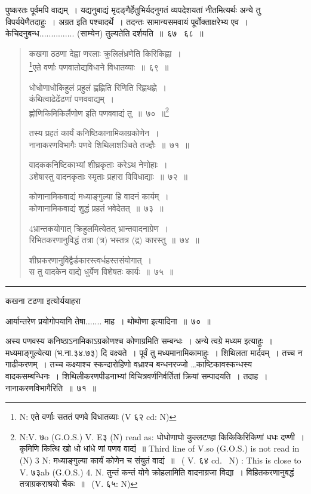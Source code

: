 \documentclass[11pt, openany]{book}
\begin{document}
पुष्करतः पूर्वमपि वाद्यम्~। यद्यनुबाद्यं मृदङ्गैर्हेतुभिर्यदनुगतं व्यपदेशयतां नीतमित्यर्थः अन्ये तु विपर्ययेणैतदाहुः~। अग्रत इति पश्चादर्थे~। तदन्तः सामान्यसमवायं पूर्वोक्ताक्षरेभ्य एव~। केचिदनुबन्ध............... (साम्येन) तुल्यतेति दर्शयति~॥~६७ \textendash\ ६८~॥

\newpage

\begin{quote}
{\na कखगा ठठणा देह्वा णरलाः क्रुलिलंध्रणेति किरिकिह्णा~।\\
\renewcommand{\thefootnote}{1}\footnote{N: एते वर्णाः सततं पणवे विधातव्याः (V ६२ cd: N)}एते वर्णाः पणवातोद्यविधाने विधातव्याः~॥~६९~॥

धोधोणाधोकिहुलं प्रहुलं ह्णह्णिति रिणिति रिह्णथह्णे~।\\
कंथित्वाढेढेंढणां पणववाद्यम्~।\\
ह्णोणिकिमिकिर्लैणोण इति पणववाद्यं तु~॥~७०~॥\renewcommand{\thefootnote}{2}\footnote{N:V. ७o (G.O.S.) V. E३ (N) read as: धोधोणाघो कुल्लटण्हा किकिकिरिकिणां धधः दण्णी~। कृमिणि कित्थि खो धो धांधे णां पणव वाद्यं~॥ Third line of V.so (G.O.S.) is not read in (N) 3 N: मध्याङ्गुल्या कार्यं कोणेन च संयुतं वाद्यं~॥~ ( V. ६४ cd.  \textendash\ N) : This is close to V. ७३ab (G.O.S.) 4. N. तुन्तं कन्तं योगे क्रोहलामिति वादनाग्रजा विद्या~। विहितकरणानुबद्धं तत्राग्रकराश्रयो चैकः~॥~ (V. ६५: N)}

तस्य प्रहतं कार्यं कनिष्ठिकानामिकाग्रकोणेन~।\\
नानाकरणविभागैः पणवे शिथिलाशञ्चिते तज्ज्ञैः~॥~७१~॥

वादककनिष्टिकाभ्यां शीघ्रकृताः करेऽथ नेणोहाः~।\\
3शेषास्तु वादनकृताः स्मृताः प्रहारा विविधाद्याः~॥~७२~॥

कोणानामिकवाद्यं मध्याङ्गुल्या हि वादनं कार्यम्~।\\
कोणानामिकवाद्यं शुद्धं प्रहतं भवेदेतत्~॥~७३~॥

4भ्रान्तकयोगात् क्रिहुलमित्येतत् भ्रान्तवादनाग्रेण~।\\
रिभितकरणानुविद्धं तत्रा (त्र) भस्तत्र (द्र) कारस्तु~॥~७४~॥

शीघ्रकरणानुविद्वैर्डकारस्त्वर्धहस्तसंयोगात्~।\\
स तु वादकेन वाद्ये धुर्येण विशेषतः कार्यः~॥~७५~॥}
\end{quote}

\hrule

\noindent
कखना टढणा इत्योर्ययाहरा

आर्यान्तरेण प्रयोगोपयागि तेषा....... माह~। थोथोणा इत्यादिना~॥~७०~॥

अस्य पणवस्य {\qtt कनिष्ठाऽनामिकाऽग्रकोणश्च} कोणाग्रमिति सम्बन्धः~। {\qtt अन्ये} त्वग्रे मध्यम इत्याहुः~। {\qtt मध्यमाङ्गुल्येत्या} (भ.ना.३४.७३) दि वक्ष्यते~। पूर्वं तु मध्यमानामिकामाहुः~। शिथिलता मार्दवम्~। तच्च न गाढीकरणम्~। तच्च कक्ष्याश्च स्कन्दारोहिणो वध्राश्च बन्धनरज्जो \ldots काष्टिकावस्कन्धस्य वादकसम्बन्धिनः~। शिथिलीकरणपीडनाभ्यां विचित्रवर्णनिर्वर्तितां क्रियां सम्पादयति~। {\qtt तदाह}~। नानाकरणविभागैरिति~॥~७१~॥\\
\end{document}
